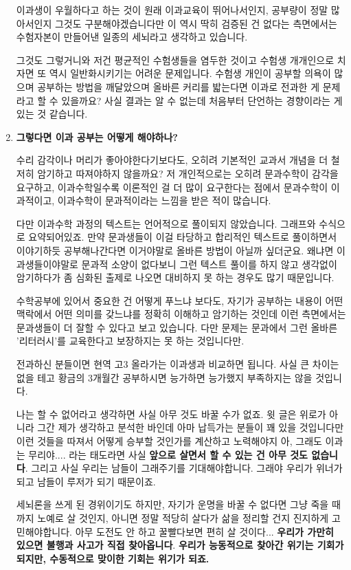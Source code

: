 \begin{enumerate}
이과생이 우월하다고 하는 것이 원래 이과교육이 뛰어나서인지, 공부량이 정말 많아서인지 그것도 구분해야겠습니다만   이 역시 딱히 검증된 건 없다는 측면에서는 수험자본이 만들어낸 일종의 세뇌라고 생각하고 있습니다.   
\vspace{5mm}

그것도 그렇거니와 저건 평균적인 수험생들을 염두한 것이고   수험생 개개인으로 치자면 또 역시 일반화시키기는 어려운 문제입니다.   수험생 개인이 공부할 의욕이 많으며 공부하는 방법을 깨달았으며 올바른 커리를 밟는다면 이과로 전과한 게 문제라고 할 수 있을까요?   사실 결과는 알 수 없는데 처음부터 단언하는 경향이라는 게 있는 것 같습니다.   

\item \textbf{그렇다면 이과 공부는 어떻게 해야하나?}   

수리 감각이나 머리가 좋아야한다기보다도, 오히려 기본적인 교과서 개념을 더 철저히 암기하고 따져야하지 않을까요?   저 개인적으로는 오히려 문과수학이 감각을 요구하고, 이과수학일수록 이론적인 걸 더 많이 요구한다는 점에서   문과수학이 이과적이고, 이과수학이 문과적이라는 느낌을 받은 적이 많습니다.   
\vspace{5mm}

다만 이과수학 과정의 텍스트는 언어적으로 풀이되지 않았습니다. 그래프와 수식으로 요약되어있죠.   만약 문과생들이 이걸 타당하고 합리적인 텍스트로 풀이하면서 이야기하듯 공부해나간다면 이거야말로 올바른 방법이 아닐까 싶더군요.   왜냐면 이과생들이야말로 문과적 소양이 없다보니 그런 텍스트 풀이를 하지 않고 생각없이 암기하다가    좀 심화된 출제로 나오면 대비하지 못 하는 경우도 많기 때문입니다.   
\vspace{5mm}

수학공부에 있어서 중요한 건 어떻게 푸느냐 보다도,   자기가 공부하는 내용이 어떤 맥락에서 어떤 의미를 갖느냐를 정확히 이해하고 암기하는 것인데   이런 측면에서는 문과생들이 더 잘할 수 있다고 보고 있습니다.   다만 문제는 문과에서 그런 올바른 '리터러시'를 교육한다고 보장하지는 못 하는 것입니다만.   


전과하신 분들이면 현역 고3 올라가는 이과생과 비교하면 됩니다. 사실 큰 차이는 없을 테고    황금의 3개월간 공부하시면 능가하면 능가했지 부족하지는 않을 것입니다. 
\vspace{5mm}

나는 할 수 없어라고 생각하면 사실 아무 것도 바꿀 수가 없죠.   윗 글은 위로가 아니라 그간 제가 생각하고 분석한 바인데 아마 납득가는 분들이 꽤 있을 것입니다만   이런 것들을 따져서 어떻게 승부할 것인가를 계산하고 노력해야지   아, 그래도 이과는 무리야.... 라는 태도라면 사실 \textbf{앞으로 살면서 할 수 있는 건 아무 것도 없습니다}.   그리고 사실 우리는 남들이 그래주기를 기대해야합니다. 그래야 우리가 위너가 되고 남들이 루저가 되기 때문이죠.   
\vspace{5mm}

세뇌론을 쓰게 된 경위이기도 하지만, 자기가 운명을 바꿀 수 없다면    그냥 죽을 때까지 노예로 살 것인지, 아니면 정말 적당히 살다가 삶을 정리할 건지 진지하게 고민해야합니다.   아무 도전도 안 하고 꿀빨다보면 편히 살 것이다... \textbf{우리가 가만히 있으면 불행과 사고가 직접 찾아옵니다}.   \textbf{우리가 능동적으로 찾아간 위기는 기회가 되지만, 수동적으로 맞이한 기회는 위기가 되죠.}      

\end{enumerate}
